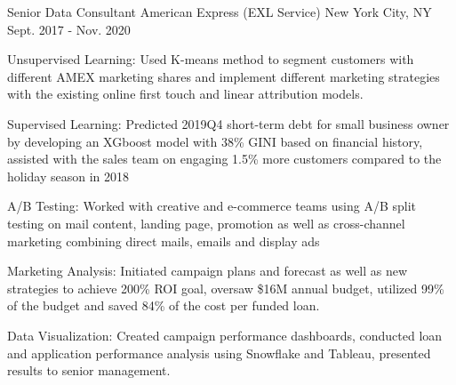 \begin{cventries}

\cventry
{Senior Data Consultant} %
{American Express (EXL Service)} %
{New York City, NY} %
{Sept. 2017 - Nov. 2020}
{
\begin{cvitems}
	\item{Unsupervised Learning: Used K-means method to segment customers with different AMEX marketing shares and implement different marketing strategies with the existing online first touch and linear attribution models.}
	\item{Supervised Learning: Predicted 2019Q4 short-term debt for small business owner by developing an XGboost model with 38\% GINI based on financial history, assisted with the sales team on engaging 1.5\% more customers compared to the holiday season in 2018}
	\item{A/B Testing: Worked with creative and e-commerce teams using A/B split testing on mail content, landing page, promotion as well as cross-channel marketing combining direct mails, emails and display ads}
	\item{Marketing Analysis: Initiated campaign plans and forecast as well as new strategies to achieve 200\% ROI goal, oversaw \$16M annual budget, utilized 99\% of the budget and saved 84\% of the cost per funded loan.}
	\item{Data Visualization: Created campaign performance dashboards, conducted loan and application performance analysis using Snowflake and Tableau, presented results to senior management.}		
\end{cvitems}
}




\end{cventries}
